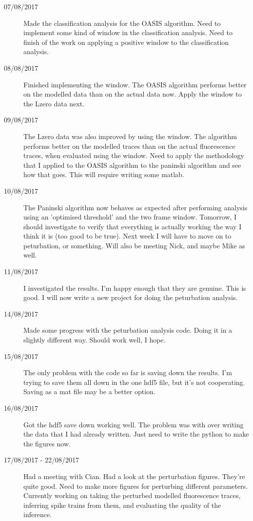 \documentclass[a4paper,12pt]{article}
\theoremstyle{definition}
\begin{document}
\begin{description}
  \item[07/08/2017] Made the classification analysis for the OASIS algorithm. Need to implement some kind of window in the classification analysis. Need to finish of the work on applying a positive window to the classification analysis.

  \item[08/08/2017] Finished implementing the window. The OASIS algorithm performs better on the modelled data than on the actual data now. Apply the window to the Lzero data next.

  \item[09/08/2017] The Lzero data was also improved by using the window. The algorithm performs better on the modelled traces than on the actual fluorescence traces, when evaluated using the window. Need to apply the methodology that I applied to the OASIS algorithm to the paninski algorithm and see how that goes. This will require writing some matlab.

  \item[10/08/2017] The Paninski algorithm now behaves as expected after performing analysis using an 'optimised threshold' and the two frame window. Tomorrow, I should investigate to verify that everything is actually working the way I think it is (too good to be true). Next week I will have to move on to peturbation, or something. Will also be meeting Nick, and maybe Mike as well.

  \item[11/08/2017] I investigated the results. I'm happy enough that they are genuine. This is good. I will now write a new project for doing the peturbation analysis.

  \item[14/08/2017] Made some progress with the peturbation analysis code. Doing it in a slightly different way. Should work well, I hope.

  \item[15/08/2017] The only problem with the code so far is saving down the results. I'm trying to save them all down in the one hdf5 file, but it's not cooperating. Saving as a mat file may be a better option.

  \item[16/08/2017] Got the hdf5 save down working well. The problem was with over writing the data that I had already written. Just need to write the python to make the figures now.

  \item[17/08/2017 - 22/08/2017] Had a meeting with Cian. Had a look at the perturbation figures. They're quite good. Need to make more figures for perturbing different parameters. Currently working on taking the perturbed modelled fluorescence traces, inferring spike trains from them, and evaluating the quality of the inference.


\end{description}
\end{document}
